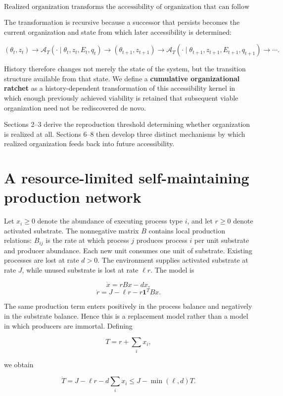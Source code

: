 \documentclass[11pt]{article}
\begin{document}
\[
\boxed{\text{Realized organization transforms the accessibility of organization that can follow it.}}
\]

The transformation is recursive because a successor that persists
becomes the current organization and state from which later
accessibility is determined:

\[
(\theta_t,z_t)
\longrightarrow
\mathcal A_T(\cdot\mid\theta_t,z_t,E_t,q_t)
\longrightarrow
(\theta_{t+1},z_{t+1})
\longrightarrow
\mathcal A_T(\cdot\mid\theta_{t+1},z_{t+1},E_{t+1},q_{t+1})
\longrightarrow\cdots.
\]

History therefore changes not merely the state of the system, but the
transition structure available from that state. We define a
\textbf{cumulative organizational ratchet} as a history-dependent
transformation of this accessibility kernel in which enough previously
achieved viability is retained that subsequent viable organization need
not be rediscovered de novo.

Sections 2--3 derive the reproduction threshold determining whether
organization is realized at all. Sections 6--8 then develop three
distinct mechanisms by which realized organization feeds back into
future accessibility.

\section{A resource-limited self-maintaining production
network}
Let \(x_i \geq 0\) denote the abundance of executing process type \(i\),
and let \(r \geq 0\) denote activated substrate. The nonnegative matrix
\(B\) contains local production relations: \(B_{ij}\) is the rate at
which process \(j\) produces process \(i\) per unit substrate and
producer abundance. Each new unit consumes one unit of substrate.
Existing processes are lost at rate \(d > 0\). The environment supplies
activated substrate at rate \(J\), while unused substrate is lost at
rate \(\ell r\). The model is

\[
\dot{x} = rBx - dx, \tag{1}
\] \[
\dot{r} = J - \ell r - r\mathbf{1}^T Bx. \tag{2}
\]

The same production term enters positively in the process balance and
negatively in the substrate balance. Hence this is a replacement model
rather than a model in which producers are immortal. Defining

\[
T = r + \sum_i x_i,
\]

we obtain

\[
\dot{T} = J - \ell r - d\sum_i x_i \leq J - \min(\ell, d)T.
\]
\end{document}
